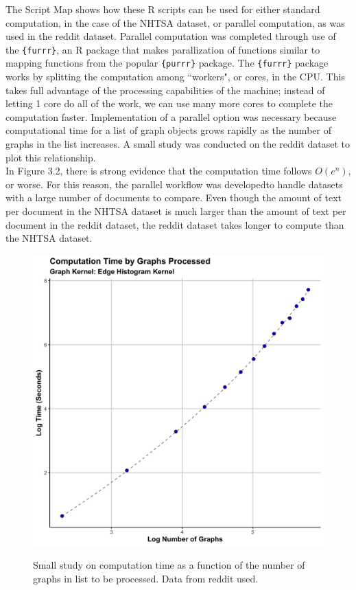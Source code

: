  The Script Map shows how these R scripts can be used for either standard computation, in the case of the NHTSA dataset, or parallel computation, as was used in the reddit dataset. Parallel computation was completed through use of the \texttt{\{furrr\}}, an R package that makes parallization of functions similar to mapping functions from the popular \texttt{\{purrr\}} package. The \texttt{\{furrr\}} package works by splitting the computation among ``workers", or cores, in the CPU. This takes full advantage of the processing capabilities of the machine; instead of letting 1 core do all of the work, we can use many more cores to complete the computation faster. Implementation of a parallel option was necessary because computational time for a list of graph objects grows rapidly as the number of graphs in the list increases. A small study was conducted on the reddit dataset to plot this relationship.\\
 
In Figure 3.2, there is strong evidence that the computation time follows $O(e^n)$, or worse. For this reason, the parallel workflow was developed\textemdash to handle datasets with a large number of documents to compare. Even though the amount of text per document in the NHTSA dataset is much larger than the amount of text per document in the reddit dataset, the reddit dataset takes longer to compute than the NHTSA dataset. \\
 
\begin{figure}
\includegraphics[width=6in]{Content/Images/edgeHistTimePlot.png}\\
\caption{Small study on computation time as a function of the number of graphs in list to be processed. Data from reddit used.}
\end{figure}

